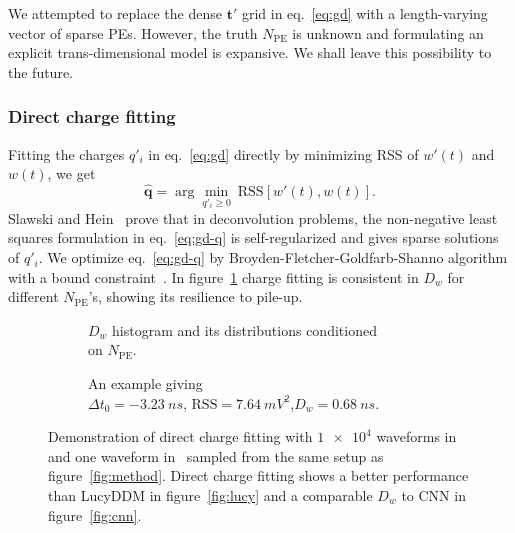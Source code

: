 We attempted to replace the dense $\bm{t'}$ grid in eq.~\eqref{eq:gd} with a length-varying vector of sparse PEs. However, the truth $N_\mathrm{PE}$ is unknown and formulating an explicit trans-dimensional model is expansive.  We shall leave this possibility to the future.

\subsubsection{Direct charge fitting}
\label{sec:dcf}

Fitting the charges $q'_i$ in eq.~\eqref{eq:gd} directly by minimizing RSS of $w'(t)$ and $w(t)$, we get
\begin{equation}
  \label{eq:gd-q}
  \bm{\hat{q}} = \arg \underset{q'_i \ge 0}{\min}~\mathrm{RSS}\left[w'(t),w(t)\right].
\end{equation}
Slawski and Hein~\cite{slawski_non-negative_2013} prove that in deconvolution problems, the non-negative least squares formulation in eq.~\eqref{eq:gd-q} is self-regularized and gives sparse solutions of $q'_i$.  We optimize eq.~\eqref{eq:gd-q} by Broyden-Fletcher-Goldfarb-Shanno algorithm with a bound constraint~\cite{byrd_limited_1995}.  In figure~\ref{fig:fitting-npe} charge fitting is consistent in $D_w$ for different $N_\mathrm{PE}$'s, showing its resilience to pile-up.

\begin{figure}[H]
  \begin{subfigure}{.5\textwidth}
    \centering
    \resizebox{\textwidth}{!}{}
    \caption{\label{fig:fitting-npe} $D_w$ histogram and its distributions conditioned \\ on $N_{\mathrm{PE}}$.}
  \end{subfigure}
  \begin{subfigure}{.5\textwidth}
    \centering
    \resizebox{\textwidth}{!}{}
    \caption{\label{fig:fitting}An example giving \\ $\Delta{t_0}=\SI{-3.23}{ns}$, $\mathrm{RSS}=\SI{7.64}{mV^2}$,$D_w=\SI{0.68}{ns}$.}
  \end{subfigure}
  \caption{\label{fig:dcf}Demonstration of direct charge fitting with $\num[retain-unity-mantissa=false]{1e4}$ waveforms in~ and one waveform in~ sampled from the same setup as figure~\ref{fig:method}.  Direct charge fitting shows a better performance than LucyDDM in figure~\ref{fig:lucy} and a comparable $D_w$ to CNN in figure~\ref{fig:cnn}.}
\end{figure}

